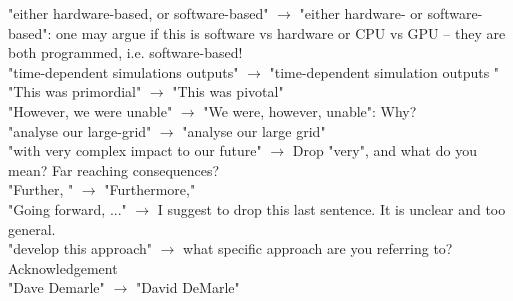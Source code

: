 \documentclass[]{article}
\begin{document}
"either hardware-based, or software-based" $\rightarrow$ "either hardware- or software-based": one may argue if this is software vs hardware or CPU vs GPU -- they are both programmed, i.e. software-based!\\

"time-dependent simulations outputs" $\rightarrow$ "time-dependent simulation outputs "\\

"This was primordial" $\rightarrow$ "This was pivotal"\\

"However, we were unable" $\rightarrow$ "We were, however, unable": Why?\\

"analyse our large-grid" $\rightarrow$ "analyse our large grid"\\

"with very complex impact to our future" $\rightarrow$ Drop "very", and what do you mean? Far reaching consequences?\\

"Further, " $\rightarrow$ "Furthermore,"\\

"Going forward, ..." $\rightarrow$ I suggest to drop this last sentence. It is unclear and too general.\\

"develop this approach" $\rightarrow$ what specific approach are you referring to?\\


Acknowledgement \\

"Dave Demarle" $\rightarrow$ "David DeMarle"
\end{document}
